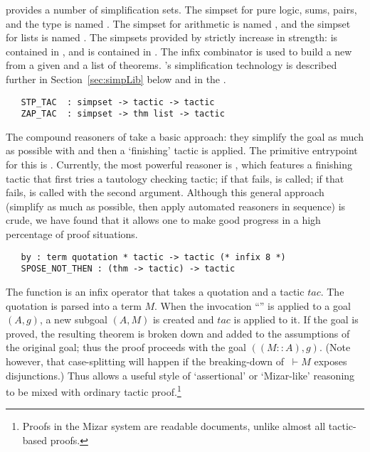  provides a number of simplification sets. The
simpset for pure logic, sums, pairs, and the  type is
named . The simpset for arithmetic is named
, and the simpset for lists is named .
The simpsets provided by \bossLib{} strictly increase in strength:
 is contained in , and  is
contained in .  The infix combinator \ml{\&\&} is used
to build a new \simpset{} from a given \simpset{} and a list of
theorems. \HOL's simplification technology is described further in
Section~\ref{sec:simpLib} below and in the \REFERENCE.

\begin{verbatim}
   STP_TAC  : simpset -> tactic -> tactic
   ZAP_TAC  : simpset -> thm list -> tactic
\end{verbatim}

The compound reasoners of  take a basic approach: they
simplify the goal as much as possible with  and then a
`finishing' tactic is applied. The primitive entrypoint for this is
. Currently, the most powerful reasoner is
, which features a finishing tactic that first
tries a tautology checking tactic; if that fails,  is
called; if that fails,  is called with the second
argument. Although this general approach (simplify as much as possible,
then apply automated reasoners in sequence) is crude, we have found that
it allows one to make good progress in a high percentage of proof
situations.

\begin{verbatim}
   by : term quotation * tactic -> tactic (* infix 8 *)
   SPOSE_NOT_THEN : (thm -> tactic) -> tactic
\end{verbatim}

The function  is an infix operator that takes a quotation
and a tactic $tac$. The quotation is parsed into a term $M$. When the
invocation ``'' is applied to a goal
$(A,g)$, a new subgoal $(A,M)$ is created and $tac$ is applied to it.
If the goal is proved, the resulting theorem is broken down and added
to the assumptions of the original goal; thus the proof proceeds with
the goal $((M::A), g)$. (Note however, that case-splitting will happen
if the breaking-down of $\ \vdash M$ exposes disjunctions.) Thus
 allows a useful style of `assertional' or `Mizar-like'
reasoning to be mixed with ordinary tactic proof.\footnote{Proofs in
  the Mizar system are readable documents, unlike almost all
  tactic-based proofs.}

